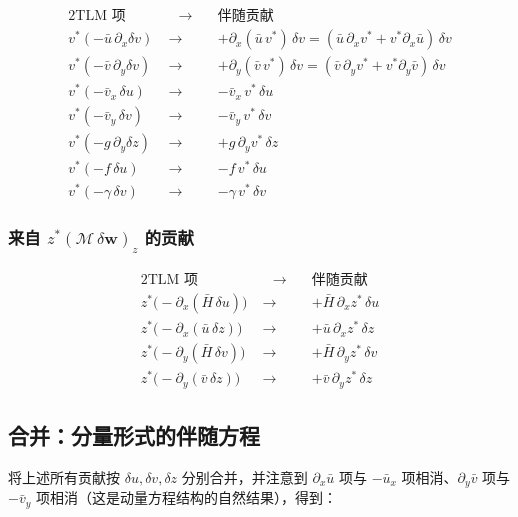 \documentclass[12pt,a4paper,twoside]{article}
\begin{document}
\begin{alignat*}{2}
    \text{TLM 项} &\quad\longrightarrow\quad & \text{伴随贡献} \\
    v^*(-\bar u\,\partial_x\delta v) &\;\longrightarrow\; & +\partial_x(\bar u\,v^*)\,\delta v = (\bar u\,\partial_x v^* + v^*\partial_x\bar u)\,\delta v \\
    v^*(-\bar v\,\partial_y\delta v) &\;\longrightarrow\; & +\partial_y(\bar v\,v^*)\,\delta v = (\bar v\,\partial_y v^* + v^*\partial_y\bar v)\,\delta v \\
    v^*(-\bar v_x\,\delta u) &\;\longrightarrow\; & -\bar v_x\,v^*\,\delta u \\
    v^*(-\bar v_y\,\delta v) &\;\longrightarrow\; & -\bar v_y\,v^*\,\delta v \\
    v^*(-g\,\partial_y\delta z) &\;\longrightarrow\; & +g\,\partial_y v^*\,\delta z \\
    v^*(-f\,\delta u) &\;\longrightarrow\; & -f\,v^*\,\delta u \\
    v^*(-\gamma\,\delta v) &\;\longrightarrow\; & -\gamma\,v^*\,\delta v
\end{alignat*}

\subsubsection*{来自 $z^* (\mathcal{M}\,\delta\mathbf{w})_z$ 的贡献}

\begin{alignat*}{2}
    \text{TLM 项} &\quad\longrightarrow\quad & \text{伴随贡献} \\
    z^*\big(-\partial_x(\bar H\,\delta u)\big) &\;\longrightarrow\; & +\bar H\,\partial_x z^*\,\delta u \\
    z^*\big(-\partial_x(\bar u\,\delta z)\big) &\;\longrightarrow\; & +\bar u\,\partial_x z^*\,\delta z \\
    z^*\big(-\partial_y(\bar H\,\delta v)\big) &\;\longrightarrow\; & +\bar H\,\partial_y z^*\,\delta v \\
    z^*\big(-\partial_y(\bar v\,\delta z)\big) &\;\longrightarrow\; & +\bar v\,\partial_y z^*\,\delta z
\end{alignat*}

\subsection{合并：分量形式的伴随方程}

将上述所有贡献按 $\delta u, \delta v, \delta z$ 分别合并，并注意到 $\partial_x\bar u$ 项与 $-\bar u_x$ 项相消、$\partial_y\bar v$ 项与 $-\bar v_y$ 项相消（这是动量方程结构的自然结果），得到：
\end{document}
